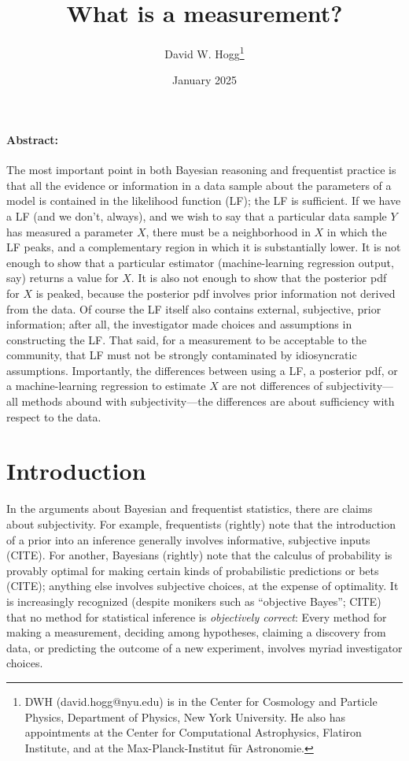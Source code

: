 \documentclass{article}
\title{\bfseries
What is a measurement?}
\author{David W. Hogg\footnote{%
DWH (david.hogg@nyu.edu) is in the Center for Cosmology and Particle Physics, Department of Physics, New York University.
He also has appointments at the Center for Computational Astrophysics, Flatiron Institute, and at the Max-Planck-Institut f\"ur Astronomie.}}
\date{January 2025}
\begin{document}
\maketitle\thispagestyle{empty}

\paragraph{Abstract:}
The most important point in both Bayesian reasoning and frequentist practice is that all the evidence or information in a data sample about the parameters of a model is contained in the likelihood function (LF); the LF is sufficient.
If we have a LF (and we don't, always), and we wish to say that a particular data sample $Y$ has measured a parameter $X$, there must be a neighborhood in $X$ in which the LF peaks, and a complementary region in which it is substantially lower.
It is not enough to show that a particular estimator (machine-learning regression output, say) returns a value for $X$.
It is also not enough to show that the posterior pdf for $X$ is peaked, because the posterior pdf involves prior information not derived from the data.
Of course the LF itself also contains external, subjective, prior information; after all, the investigator made choices and assumptions in constructing the LF.
That said, for a measurement to be acceptable to the community, that LF must not be strongly contaminated by idiosyncratic assumptions.
Importantly, the differences between using a LF, a posterior pdf, or a machine-learning regression to estimate $X$ are not differences of subjectivity---all methods abound with subjectivity---the differences are about sufficiency with respect to the data.

\section{Introduction}
In the arguments about Bayesian and frequentist statistics, there are claims about subjectivity.
For example, frequentists (rightly) note that the introduction of a prior into an inference generally involves informative, subjective inputs (CITE).
For another, Bayesians (rightly) note that the calculus of probability is provably optimal for making certain kinds of probabilistic predictions or bets (CITE); anything else involves subjective choices, at the expense of optimality.
It is increasingly recognized (despite monikers such as ``objective Bayes''; CITE) that no method for statistical inference is \emph{objectively correct}:
Every method for making a measurement, deciding among hypotheses, claiming a discovery from data, or predicting the outcome of a new experiment, involves myriad investigator choices.
\end{document}
